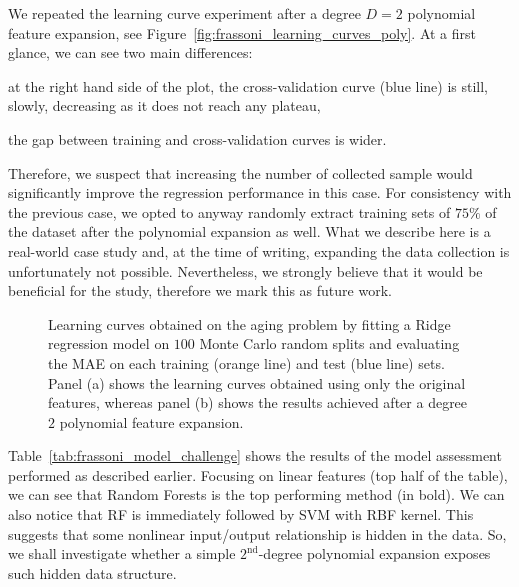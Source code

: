 We repeated the learning curve experiment after a degree $D=2$ polynomial feature expansion, see Figure~\ref{fig:frassoni_learning_curves_poly}. At a first glance, we can see two main differences:
\begin{enumerate*}[label=(\roman*)]
	\item at the right hand side of the plot, the cross-validation curve (blue line) is still, slowly, decreasing as it does not reach any plateau,
	\item the gap between training and cross-validation curves is wider.
\end{enumerate*}
Therefore, we suspect that increasing the number of collected sample would significantly improve the regression performance in this case.
For consistency with the previous case, we opted to anyway randomly extract training sets of $75\%$ of the dataset after the polynomial expansion as well.
What we describe here is a real-world case study and, at the time of writing, expanding the data collection is unfortunately not possible. Nevertheless, we strongly believe that it would be beneficial for the study, therefore we mark this as future work.


\begin{figure}[]
	\centering
    \hfill
	\caption{Learning curves obtained on the aging problem by fitting a Ridge regression model on $100$ Monte Carlo random splits and evaluating the MAE on each training (orange line) and test (blue line) sets. Panel (a) shows the learning curves obtained using only the original features, whereas panel (b) shows the results achieved after a degree $2$ polynomial feature expansion.}
\end{figure}




Table~\ref{tab:frassoni_model_challenge} shows the results of the model assessment performed as described earlier. Focusing on linear features (top half of the table), we can see that Random Forests is the top performing method (in bold). We can also notice that RF is immediately followed by SVM with RBF kernel. This suggests that some nonlinear input/output relationship is hidden in the data. So, we shall investigate whether a simple $2^\text{nd}$-degree polynomial expansion exposes such hidden data structure.

